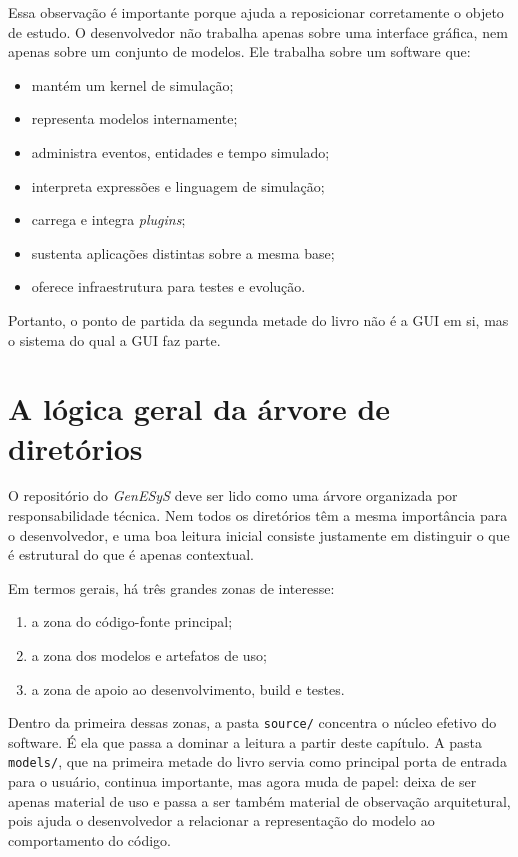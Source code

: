 Essa observação é importante porque ajuda a reposicionar corretamente o objeto de estudo. O desenvolvedor não trabalha apenas sobre uma interface gráfica, nem apenas sobre um conjunto de modelos. Ele trabalha sobre um software que:

\begin{itemize}
    \item mantém um kernel de simulação;
    \item representa modelos internamente;
    \item administra eventos, entidades e tempo simulado;
    \item interpreta expressões e linguagem de simulação;
    \item carrega e integra \textit{plugins};
    \item sustenta aplicações distintas sobre a mesma base;
    \item oferece infraestrutura para testes e evolução.
\end{itemize}

Portanto, o ponto de partida da segunda metade do livro não é a GUI em si, mas o sistema do qual a GUI faz parte.

\section{A lógica geral da árvore de diretórios}
\label{sec:cap6_logica_geral_arvore_diretorios}

O repositório do \textit{GenESyS} deve ser lido como uma árvore organizada por responsabilidade técnica. Nem todos os diretórios têm a mesma importância para o desenvolvedor, e uma boa leitura inicial consiste justamente em distinguir o que é estrutural do que é apenas contextual.

Em termos gerais, há três grandes zonas de interesse:

\begin{enumerate}
    \item a zona do código-fonte principal;
    \item a zona dos modelos e artefatos de uso;
    \item a zona de apoio ao desenvolvimento, build e testes.
\end{enumerate}

Dentro da primeira dessas zonas, a pasta \texttt{source/} concentra o núcleo efetivo do software. É ela que passa a dominar a leitura a partir deste capítulo. A pasta \texttt{models/}, que na primeira metade do livro servia como principal porta de entrada para o usuário, continua importante, mas agora muda de papel: deixa de ser apenas material de uso e passa a ser também material de observação arquitetural, pois ajuda o desenvolvedor a relacionar a representação do modelo ao comportamento do código.

